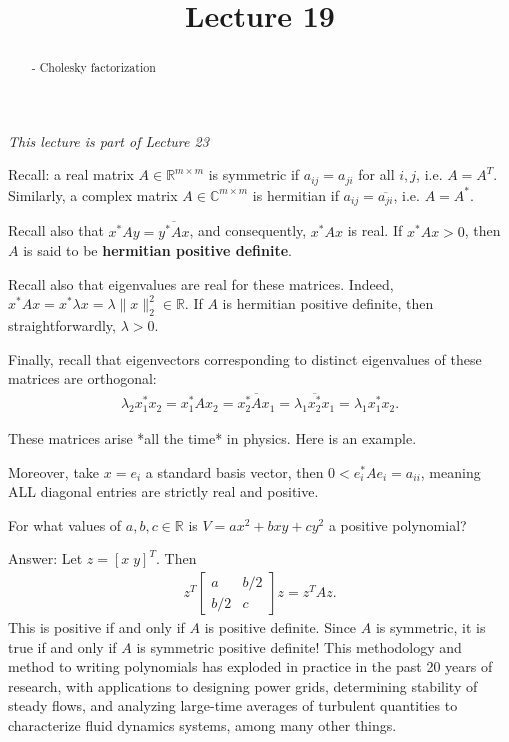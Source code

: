 \documentclass{ximera}
\begin{document}
    \title{Lecture 19}
    
    \begin{abstract} 
        - Cholesky factorization
    \end{abstract}
    \maketitle

\textit{This lecture is part of Lecture 23}

Recall: a real matrix $A\in \mathbb{R}^{m\times m}$ is symmetric if $a_{ij} = a_{ji}$ for all $i, j$, i.e. $A = A^T.$  Similarly, a complex matrix $A\in\mathbb{C}^{m\times m}$ is hermitian if $a_{ij} = \overline{a_{ji}}$, i.e. $A = A^*$.

Recall also that 
$x^*Ay = \overline{y^*Ax}$, and consequently, $x^*Ax$ is real.  If $x^*Ax > 0$, then $A$ is said to be \textbf{hermitian positive definite}.

Recall also that eigenvalues are real for these matrices.  Indeed, $x^*Ax = x^*\lambda x =\lambda \|x\|_2^2\in\mathbb{R}$.  If $A$ is hermitian positive definite, then straightforwardly, $\lambda > 0$.

Finally, recall that eigenvectors corresponding to distinct eigenvalues of these matrices are orthogonal:
\begin{align*}
    \lambda_2x_1^*x_2 = x_1^*Ax_2 = \overline{x_2^*Ax_1} = \overline{\lambda_1x_2^*x_1} = \lambda_1x_1^*x_2.
\end{align*}

These matrices arise *all the time* in physics.  Here is an example. 

Moreover, take $x = e_i$ a standard basis vector, then $0 < e_i^*Ae_i = a_{ii}$, meaning ALL diagonal entries are strictly real and positive.

\begin{example}
    For what values of $a, b, c \in \mathbb{R}$ is $V = ax^2 + bxy + cy^2$ a positive polynomial?

    Answer:  Let $z = [x \;y]^T$.  Then
    \begin{align*}
        z^T \begin{bmatrix} 
            a & b/2 \\ b/2 & c
        \end{bmatrix}
        z = z^T A z.
    \end{align*}
    This is positive if and only if $A$ is positive definite.  Since $A$ is symmetric, it is true if and only if $A$ is symmetric positive definite!
    This methodology and method to writing polynomials has exploded in practice in the past 20 years of research, with applications to designing power grids, determining stability of steady flows, and analyzing large-time averages of turbulent quantities to characterize fluid dynamics systems, among many other things.
\end{example}
\end{document}
